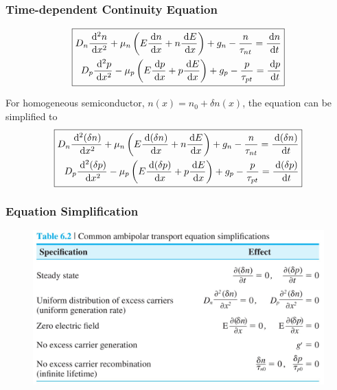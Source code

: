 \documentclass{beamer}
\begin{document}
    \begin{frame} \frametitle{Time-dependent Continuity Equation}
        \begin{equation*}
            \boxed{
                \begin{aligned}
                    D_n \frac{\: \mathrm{d}^2 n}{\: \mathrm{d} x^2} + \mu_n \left( E \frac{\: \mathrm{d} n}{\: \mathrm{d} x} + n \frac{\: \mathrm{d} E}{\: \mathrm{d} x}  \right) + g_n - \frac{n}{\tau_{nt}} = \frac{\: \mathrm{d} n}{\: \mathrm{d} t} \\
                    D_p \frac{\: \mathrm{d}^2 p}{\: \mathrm{d} x^2} - \mu_p \left( E \frac{\: \mathrm{d} p}{\: \mathrm{d} x} + p \frac{\: \mathrm{d} E}{\: \mathrm{d} x}  \right) + g_p - \frac{p}{\tau_{pt}} = \frac{\: \mathrm{d} p}{\: \mathrm{d} t} \\
                \end{aligned}
            }
        \end{equation*}
        \par For homogeneous semiconductor, $n(x) = n_0 + \delta n(x)$, the equation can be simplified to 
        \begin{equation*}
            \boxed{
                \begin{aligned}
                    D_n \frac{\: \mathrm{d}^2 (\delta n)}{\: \mathrm{d} x^2} + \mu_n \left( E \frac{\: \mathrm{d} (\delta n)}{\: \mathrm{d} x} + n \frac{\: \mathrm{d} E}{\: \mathrm{d} x}  \right) + g_n - \frac{n}{\tau_{nt}} = \frac{\: \mathrm{d} (\delta n)}{\: \mathrm{d} t} \\
                    D_p \frac{\: \mathrm{d}^2 (\delta p)}{\: \mathrm{d} x^2} - \mu_p \left( E \frac{\: \mathrm{d} (\delta p)}{\: \mathrm{d} x} + p \frac{\: \mathrm{d} E}{\: \mathrm{d} x}  \right) + g_p - \frac{p}{\tau_{pt}} = \frac{\: \mathrm{d} (\delta p)}{\: \mathrm{d} t} \\
                \end{aligned}
            }
        \end{equation*}
    \end{frame}

    \begin{frame} \frametitle{Equation Simplification}
        \begin{figure}[H]
            \centering
            \includegraphics[width=0.9\linewidth]{Equation-simplification.jpg}
            \label{fig:Equation-simplification.jpg}
        \end{figure}
    \end{frame}
\end{document}
